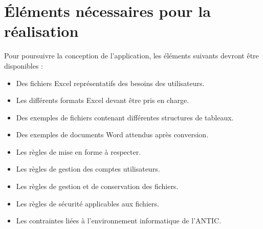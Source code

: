 \chapter{Éléments nécessaires pour la réalisation}

Pour poursuivre la conception de l'application, les éléments suivants devront être disponibles :

\begin{itemize}
    \item Des fichiers Excel représentatifs des besoins des utilisateurs.
    \item Les différents formats Excel devant être pris en charge.
    \item Des exemples de fichiers contenant différentes structures de tableaux.
    \item Des exemples de documents Word attendus après conversion.
    \item Les règles de mise en forme à respecter.
    \item Les règles de gestion des comptes utilisateurs.
    \item Les règles de gestion et de conservation des fichiers.
    \item Les règles de sécurité applicables aux fichiers.
    \item Les contraintes liées à l'environnement informatique de l'ANTIC.
\end{itemize}
